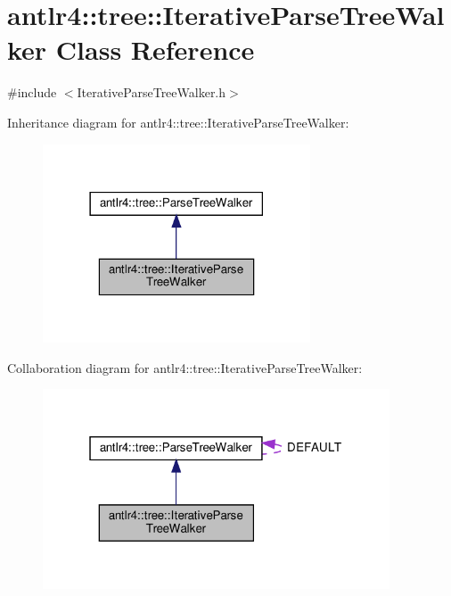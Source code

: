 \hypertarget{classantlr4_1_1tree_1_1IterativeParseTreeWalker}{}\section{antlr4\+:\+:tree\+:\+:Iterative\+Parse\+Tree\+Walker Class Reference}
\label{classantlr4_1_1tree_1_1IterativeParseTreeWalker}


{\ttfamily \#include $<$Iterative\+Parse\+Tree\+Walker.\+h$>$}



Inheritance diagram for antlr4\+:\+:tree\+:\+:Iterative\+Parse\+Tree\+Walker\+:
\nopagebreak
\begin{figure}[H]
\begin{center}
\leavevmode
\includegraphics[width=225pt]{classantlr4_1_1tree_1_1IterativeParseTreeWalker__inherit__graph}
\end{center}
\end{figure}


Collaboration diagram for antlr4\+:\+:tree\+:\+:Iterative\+Parse\+Tree\+Walker\+:
\nopagebreak
\begin{figure}[H]
\begin{center}
\leavevmode
\includegraphics[width=292pt]{classantlr4_1_1tree_1_1IterativeParseTreeWalker__coll__graph}
\end{center}
\end{figure}
